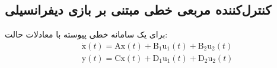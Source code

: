 

\subsection{کنترل‌کننده مربعی خطی مبتنی بر بازی دیفرانسیلی}\label{LQDG}
برای یک سامانه خطی پیوسته با معادلات حالت:
 \begin{equation}\label{systemlqdg}
 	\begin{split}
	&\boldsymbol{\dot{\mathrm{x}}}(t) = \boldsymbol{\mathrm{Ax}}(t) + \boldsymbol{\mathrm{B_1u_1}}(t) + \boldsymbol{\mathrm{B_2u_2}}(t)%
	\\
	&\boldsymbol{\mathrm{y}}(t) = \boldsymbol{\mathrm{Cx}}(t) + \boldsymbol{\mathrm{D_1u_1}}(t) + \boldsymbol{\mathrm{D_2u_2}}(t)
\end{split}
\end{equation}

